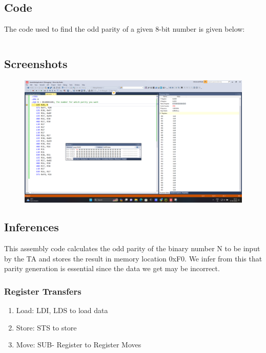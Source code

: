 \documentclass[titlepage, 11pt]{article}
\begin{document}
\subsection{Code}
The code used to find the odd parity of a given 8-bit number is given below:

{\renewcommand\fcolorbox[4][]{\textcolor{black}{\strut#4}}
\inputminted[breaklines,
 mathescape,
 linenos,
 numbersep=5pt,
 frame=single,
 numbersep=5pt,
 xleftmargin=0pt]{asm}{"Prob3.asm"}}

\subsection{Screenshots}
\begin{figure}[H]
  \centering
  \includegraphics[width=1\linewidth]{prob3.png}
\end{figure}

\subsection{Inferences}
This assembly code calculates the odd parity of the binary number N to be input by the TA and stores the result in memory location 0xF0.
We infer from this that parity generation is essential since the data we get may be incorrect.

\subsubsection{Register Transfers}
\begin{enumerate}
\item Load: LDI, LDS to load data
\item Store: STS to store
\item Move: SUB- Register to Register Moves
\end{enumerate}
\end{document}
